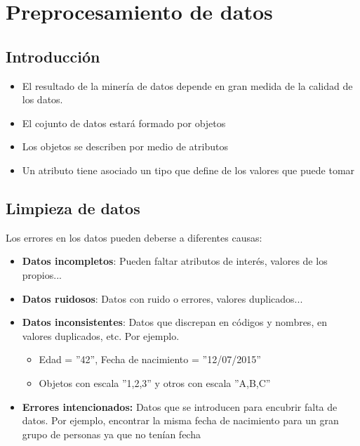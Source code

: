 \documentclass[12pt, letterpaper]{article}
\title{\doctitle}
\author{Juan Luis Serradilla Tormos}
\date{\monthname[\month] de \the\year}
\begin{document}
\maketitle

\newpage
\tableofcontents

\newpage
\section{Preprocesamiento de datos}

\subsection{Introducción}
\begin{itemize}
    \item El resultado de la minería de datos depende en gran medida de la calidad de los datos.
    \item El cojunto de datos estará formado por objetos
    \item Los objetos se describen por medio de atributos
    \item Un atributo tiene asociado un tipo que define de los valores que puede tomar
\end{itemize}

\subsection{Limpieza de datos}
Los errores en los datos pueden deberse a diferentes causas:
\begin{itemize}
    \item \textbf{Datos incompletos}: Pueden faltar atributos de interés, valores de los propios...
    \item \textbf{Datos ruidosos}: Datos con ruido o errores, valores duplicados...
    \item \textbf{Datos inconsistentes}: Datos que discrepan en códigos y nombres, en valores duplicados, etc. Por ejemplo.
    \begin{itemize}
        \item Edad = ''42'', Fecha de nacimiento = ''12/07/2015''
        \item Objetos con escala ''1,2,3'' y otros con escala ''A,B,C''
    \end{itemize}
    \item \textbf{Errores intencionados:} Datos que se introducen para encubrir falta de datos. Por ejemplo, encontrar la misma fecha de nacimiento para un gran grupo de personas ya que no tenían fecha 
\end{itemize}
\end{document}

